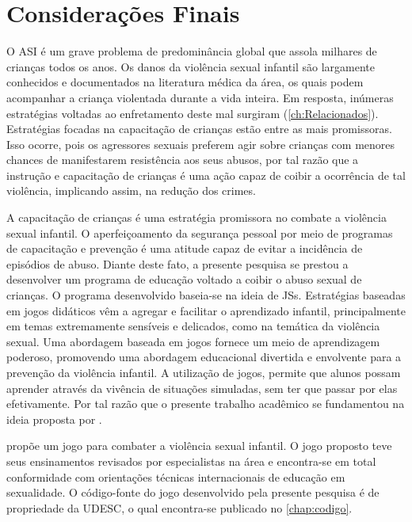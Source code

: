 \chapter{Considerações Finais}\label{ch:Conclusao}

O \acf{ASI} é um grave problema de predominância global que assola milhares de crianças todos os anos. Os danos da violência sexual infantil são largamente conhecidos e documentados na literatura médica da área, os quais podem acompanhar a criança violentada durante a vida inteira. Em resposta, inúmeras estratégias voltadas ao enfretamento deste mal surgiram (\autoref{ch:Relacionados}). Estratégias focadas na capacitação de crianças estão entre as mais promissoras. Isso ocorre, pois os agressores sexuais preferem agir sobre crianças com menores chances de manifestarem resistência aos seus abusos, por tal razão que a instrução e capacitação de crianças é uma ação capaz de coibir a ocorrência de tal violência, implicando assim, na redução dos crimes.

A capacitação de crianças é uma estratégia promissora no combate a violência sexual infantil. O aperfeiçoamento da segurança pessoal por meio de programas de capacitação e prevenção é uma atitude capaz de evitar a incidência de episódios de abuso. Diante deste fato, a presente pesquisa se prestou a desenvolver um programa de educação voltado a coibir o abuso sexual de crianças. O programa desenvolvido baseia-se na ideia de \acfp{JS}. Estratégias baseadas em jogos didáticos vêm a agregar e facilitar o aprendizado infantil, principalmente em temas extremamente sensíveis e delicados, como na temática da violência sexual. Uma abordagem baseada em jogos fornece um meio de aprendizagem poderoso, promovendo uma abordagem educacional divertida e envolvente para a prevenção da violência infantil. A utilização de jogos, permite que alunos possam aprender através da vivência de situações simuladas, sem ter que passar por elas efetivamente. Por tal razão que o presente trabalho acadêmico se fundamentou na ideia proposta por . 

 propõe um jogo para combater a violência sexual infantil. O jogo proposto teve seus ensinamentos revisados por especialistas na área e encontra-se em total conformidade com orientações técnicas internacionais de educação em sexualidade. O código-fonte do jogo desenvolvido pela presente pesquisa é de propriedade da \ac{UDESC}, o qual encontra-se publicado no \autoref{chap:codigo}. %

